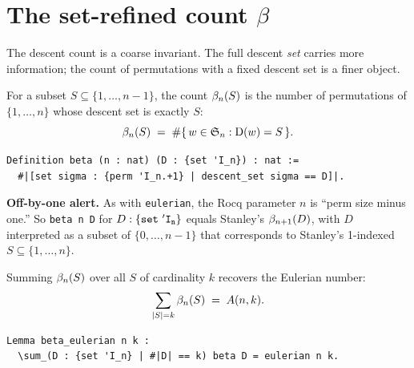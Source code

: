 \section{The set-refined count $\beta$}
\label{sec:beta}

The descent count is a coarse invariant. The full descent
\emph{set} carries more information; the count of permutations with
a fixed descent set is a finer object.

\begin{definition}
  \label{def:beta}
  For a subset $S \subseteq \{1, \dots, n-1\}$, the count
  $\beta_{n}(S)$ is the number of permutations of $\{1, \dots, n\}$
  whose descent set is exactly $S$:
  \[
    \beta_{n}(S) \;=\; \#\{\, w \in \mathfrak{S}_{n} : \mathrm{D}(w) = S \,\}.
  \]
\end{definition}

\begin{lstlisting}[language=Rocq]
Definition beta (n : nat) (D : {set 'I_n}) : nat :=
  #|[set sigma : {perm 'I_n.+1} | descent_set sigma == D]|.
\end{lstlisting}


\noindent
\textbf{Off-by-one alert.} As with \texttt{eulerian}, the Rocq
parameter $n$ is ``perm size minus one.'' So
\texttt{beta n D} for $D : \mathtt{\{set\ \mathtt{'I_{n}}\}}$ equals Stanley's
$\beta_{n+1}(D)$, with $D$ interpreted as a subset of $\{0, \dots, n-1\}$
that corresponds to Stanley's 1-indexed $S \subseteq \{1, \dots, n\}$.

\begin{lemma}
  \label{lem:beta_eulerian}
  Summing $\beta_{n}(S)$ over all $S$ of cardinality $k$ recovers the
  Eulerian number:
  \[
    \sum_{|S| = k} \beta_{n}(S) \;=\; A(n, k).
  \]
\end{lemma}

\begin{lstlisting}[language=Rocq]
Lemma beta_eulerian n k :
  \sum_(D : {set 'I_n} | #|D| == k) beta D = eulerian n k.
\end{lstlisting}


